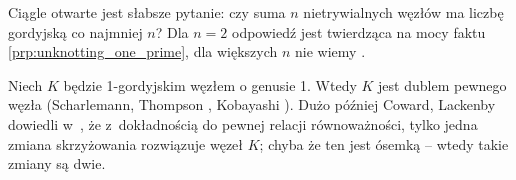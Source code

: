 Ciągle otwarte jest słabsze pytanie: czy suma $n$ nietrywialnych węzłów ma liczbę gordyjską co najmniej $n$?
Dla $n = 2$ odpowiedź jest twierdząca na mocy faktu \ref{prp:unknotting_one_prime}, dla większych $n$ nie wiemy \cite[problem 1.3]{baykur2026}.

Niech $K$ będzie 1-gordyjskim węzłem o genusie 1.
Wtedy $K$ jest dublem pewnego węzła (Scharlemann, Thompson \cite{thompson1988}, Kobayashi \cite{kobayashitsuyoshi1989}).
%
%
%
Dużo później Coward, Lackenby dowiedli w~\cite{coward2011}, że z~dokładnością do pewnej relacji równoważności, tylko jedna zmiana skrzyżowania rozwiązuje węzeł $K$; chyba że ten jest ósemką -- wtedy takie zmiany są dwie.
%
%

